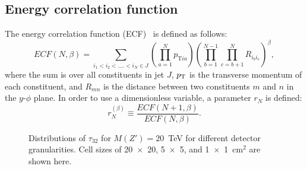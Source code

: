 \subsection{Energy correlation function \label{sec:ecf}}
The energy correlation function (ECF)~\cite{Larkoski:2013eya} is defined as follows: 
\begin{equation} \label{eq:ECF_Modified}
ECF(N,\beta)=\sum_{i_{1}<i_{2}<....<i_{N}\in J} \left(\prod_{a=1}^{N}p_{\mathrm{T}ia}\right)\left(\prod_{b=1}^{N-1}\prod_{c=b+1}^{N} R_{i_{b}i_{c}}\right)^{\beta},
\end{equation}
where the sum is over all constituents in jet $J$, $p_{\mathrm{T}}$ is the transverse 
momentum of each constituent, and $R_{mn}$ is the distance between two constituents $m$ and $n$ in the $y$-$\phi$ plane.  
In order to use a dimensionless variable, a parameter $r_{N}$ is defined:
\begin{equation} \label{eq:ECF_ratio}
r_{N}^{(\beta)}\equiv\frac{ECF(N+1,\beta)}{ECF(N,\beta)}.
\end{equation}

\begin{figure}
\begin{center}
\end{center}
\caption{Distributions of $\tau_{32}$ for $M (Z') =20$~TeV for different 
detector granularities. Cell sizes of 20~$\times$~20, 5~$\times$~5, and 1~$\times$~1~cm$^2$ 
are shown here.
\label{fig:Rawhit_05GeV_tau32_Dis}
}
\end{figure}

